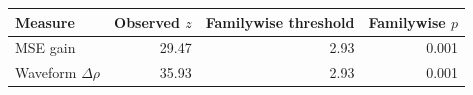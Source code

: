 \begin{tabular}{@{}lrrr@{}}
\toprule
Measure & Observed $z$ & Familywise threshold & Familywise $p$ \\
\midrule
MSE gain & 29.47 & 2.93 & 0.001 \\
Waveform $\Delta\rho$ & 35.93 & 2.93 & 0.001 \\
\bottomrule
\end{tabular}
